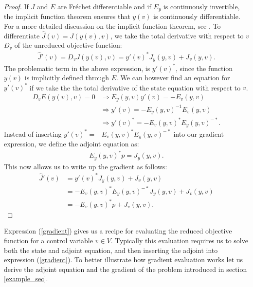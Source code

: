 \begin{proof}
If $J$ and $E$ are  Fr\'{e}chet differentiable and if $E_y$ is continuously invertible, the implicit function theorem ensures that $y(v)$ is continuously differentiable. For a more detailed discussion on the implicit function theorem, see \cite{hinze2008optimization}. To differentiate $\hat J(v) = J(y(v),v)$, we take the total derivative with respect to $v$ $D_v$ of the unreduced objective function:
\begin{align*}
\hat J'(v)=D_vJ(y(v),v) = y'(v)^*J_y(y,v) + J_v(y,v).
\end{align*}
The problematic term in the above expression, is $y'(v)^*$, since the function $y(v)$ is implicitly defined through $E$. We can however find an equation for $y'(v)^*$ if we take the the total derivative of the state equation with respect to $v$.
\begin{align*}
D_vE(y(v),v)=0 &\Rightarrow E_y(y,v)y'(v)=-E_v(y,v) \\ 
&\Rightarrow y'(v)=-E_y(y,v)^{-1}E_v(y,v) \\ 
&\Rightarrow y'(v)^* = -E_v(y,v)^*E_y(y,v)^{-*}.
\end{align*}
Instead of inserting $y'(v)^* = -E_v(y,v)^*E_y(y,v)^{-*}$ into our gradient expression, we define the adjoint equation as:
\begin{align*}
E_y(y,v)^{*}p=J_y(y,v). 
\end{align*}
This now allows us to write up the gradient as follows:
\begin{align*}
\hat{J}'(v)&= y'(v)^*J_y(y,v) + J_v(y,v)\\
&=-E_v(y,v)^*E_y(y,v)^{-*}J_y(y,v) + J_v(y,v) \\
&= -E_v(y,v)^*p +J_v(y,v). 
\end{align*}
\end{proof}
\noindent
Expression (\ref{gradient}) gives us a recipe for evaluating the reduced objective function for a control variable $v\in V$. Typically this evaluation requires us to solve both the state and adjoint equation, and then inserting the adjoint into expression (\ref{gradient}). To better illustrate how gradient evaluation works let us derive the adjoint equation and the gradient of the problem introduced in section \ref{example_sec}.
